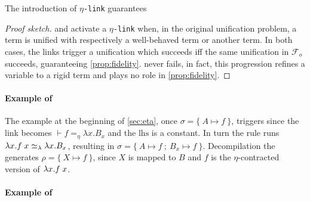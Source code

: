 \documentclass[sigconf,natbib=false,review]{acmart}
\newcommand{\appsep}{\ensuremath{\textcolor{lightgray}{\cdot}}}
\newcommand{\UnifRel}{\ensuremath{\simeq}}
\newcommand{\Ue}{\ensuremath{\UnifRel_\lambda}\xspace}
\newcommand{\linkMacro}[1]{\ensuremath{#1}\texttt{-link}\xspace}
\newcommand{\linketa} {\linkMacro{\eta}}
\newcommand{\Fo}{\ensuremath{\mathcal{F}_{\!o}\xspace}} %
\newcommand{\linketaM}[3]{\ensuremath{#1 \vdash #2 =_\eta #3}}
\newcommand{\lhs}{\ensuremath{\mathrm{lhs}}\xspace}
\begin{document}
\begin{theorem}
  The introduction 
  of \linketa guarantees  
  \label{lemma:fidelity-maybeeta}
\end{theorem}

\begin{proof}[Proof sketch]
  \progressetaleft and \progressetadedup activate a \linketa when, in the
  original unification problem, a \maybeeta term is unified with respectively a
  well-behaved term or another \maybeeta term. In both cases, the links trigger
  a unification which succeeds iff the same unification in \Fo{} succeeds,
  guaranteeing \cref{prop:fidelity}. \progressetaright never fails, in fact,
  this progression refines a variable to a rigid term and plays no role in 
  \cref{prop:fidelity}.
\end{proof}

\paragraph{Example of \progressetaleft}

The example at the beginning of \cref{sec:eta}, once
$\sigma = \{~ A \mapsto f ~\}$, triggers \progressetaleft since the link
becomes \linketaM{}{f}{\lambda x.B_{x}} and the \lhs is a constant.
In turn the rule runs $\lambda x.f \appsep x \Ue{} \lambda x.B_{x}$,
resulting in $\sigma = \{~ A \mapsto f ~;~ B_{x} \mapsto f ~\}$.
Decompilation the generates $\rho = \{~ X \mapsto f ~\}$, since
$X$ is mapped to $B$ and
$f$ is the $\eta$-contracted version of $\lambda x.f \appsep x$.

\paragraph{Example of \progressetadedup}
\end{document}
